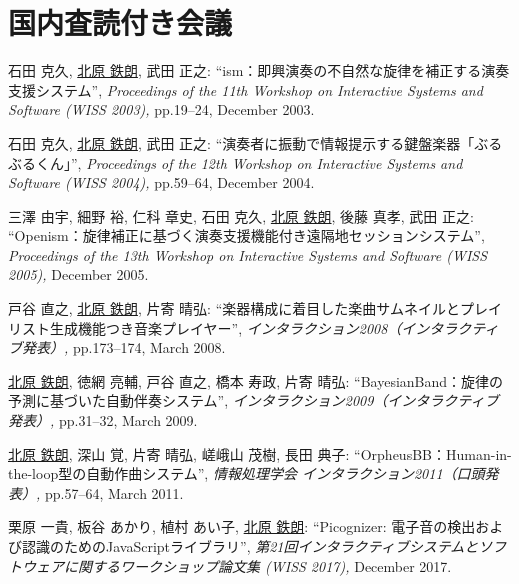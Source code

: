 \section*{国内査読付き会議}
\begin{Enumerate}
  
\item 
石田 克久, 
\underline{北原 鉄朗}, 
武田 正之: 
    ``ism：即興演奏の不自然な旋律を補正する演奏支援システム'', 
    {\it Proceedings of the 11th Workshop on Interactive
      Systems and Software
          (WISS 2003),
        } pp.19--24, December 2003. 

\item 
石田 克久, 
\underline{北原 鉄朗}, 
武田 正之: 
    ``演奏者に振動で情報提示する鍵盤楽器「ぶるぶるくん」'', 
    {\it Proceedings of the 12th Workshop on Interactive
      Systems and Software
          (WISS 2004),
        } pp.59--64, December 2004. 

\item 
三澤 由宇, 
細野 裕, 
仁科 章史, 
石田 克久, 
\underline{北原 鉄朗}, 
後藤 真孝, 
武田 正之: 
    ``Openism：旋律補正に基づく演奏支援機能付き遠隔地セッションシステム'', 
    {\it Proceedings of the 13th Workshop on Interactive
      Systems and Software
          (WISS 2005),
        } December 2005. 

\item 
戸谷 直之, 
\underline{北原 鉄朗}, 
片寄 晴弘: 
    ``楽器構成に着目した楽曲サムネイルとプレイリスト生成機能つき音楽プレイヤー'', 
    {\it インタラクション2008（インタラクティブ発表）,
    } pp.173--174, March 2008. 

\item 
\underline{北原 鉄朗}, 
徳網 亮輔, 
戸谷 直之, 
橋本 寿政, 
片寄 晴弘: 
    ``BayesianBand：旋律の予測に基づいた自動伴奏システム'', 
    {\it インタラクション2009（インタラクティブ発表）,
    } pp.31--32, March 2009. 

\item 
\underline{北原 鉄朗}, 
深山 覚, 
片寄 晴弘, 
嵯峨山 茂樹, 
長田 典子: 
    ``OrpheusBB：Human-in-the-loop型の自動作曲システム'', 
    {\it 情報処理学会 インタラクション2011（口頭発表）,
    } pp.57--64, March 2011. 

\item 
栗原 一貴, 
板谷 あかり, 
植村 あい子, 
\underline{北原 鉄朗}: 
    ``Picognizer: 電子音の検出および認識のためのJavaScriptライブラリ'', 
    {\it 第21回インタラクティブシステムとソフトウェアに関するワークショップ論文集 (WISS 2017),
    } December 2017. 

\end{Enumerate}

